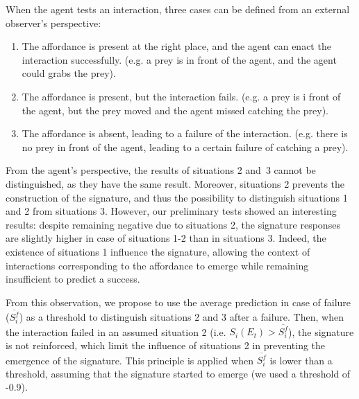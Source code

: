 \documentclass[conference]{IEEEtran}
\begin{document}
When the agent tests an interaction, three cases can be defined from an external observer's perspective:
\begin{enumerate}
\item The affordance is present at the right place, and the agent can enact the interaction successfully. (e.g. a prey is in front of the agent, and the agent could grabs the prey).
\item The affordance is present, but the interaction fails. (e.g. a prey is i front of the agent, but the prey moved and the agent missed catching the prey).
\item The affordance is absent, leading to a failure of the interaction. (e.g. there is no prey in front of the agent, leading to a certain failure of catching a prey).
\end{enumerate}
From the agent's perspective, the results of situations 2 and~3 cannot be distinguished, as they have the same result. Moreover, situations 2 prevents the construction of the signature, and thus the possibility to distinguish situations 1 and 2 from situations 3.
However, our preliminary tests showed an interesting results: despite remaining negative due to situations 2, the signature responses are slightly higher in case of situations 1-2 than in situations 3. Indeed, the existence of situations 1 influence the signature, allowing the context of interactions corresponding to the affordance to emerge while remaining insufficient to predict a success.

From this observation, we propose to use the average prediction in case of failure ($\overline{S_i^f}$) as a threshold to distinguish situations 2 and 3 after a failure. Then, when the interaction failed in an assumed situation 2 (i.e. $S_i(E_t)>\overline{S_i^f}$), the signature is not reinforced, which limit the influence of situations 2 in preventing the emergence of the signature. This principle is applied when $\overline{S_i^f}$ is lower than a threshold, assuming that the signature started to emerge (we used a threshold of -0.9).

\end{document}
